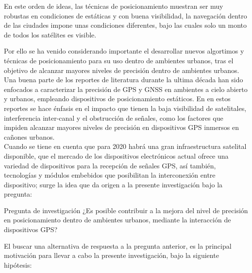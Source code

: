 En este orden de ideas, las técnicas de posicionamiento muestran ser muy robustas en condiciones de estáticas y con buena visibilidad, la navegación dentro de las ciudades impone unas condiciones diferentes, bajo las cuales solo un monto de todos los satélites es visible.

Por ello se ha venido considerando importante el desarrollar nuevos algortimos y técnicas de posicionamiento para su uso dentro de ambientes urbanos, tras el objetivo de alcanzar mayores niveles de precisión dentro de ambientes urbanos.\\

Una buena parte de los reportes de literatura durante la ultima década han sido enfocados a caracterizar la precisión de GPS y GNSS en ambientes a cielo abierto y urbanos, empleando dispositivos de posicionamiento estáticos. En en estos reportes se hace énfasis en el impacto que tienen la baja visibilidad de satelitales, interferencia inter-canal y el obstrucción de señales, como los factores que impiden alcanzar mayores niveles de precisión en dispositivos GPS inmersos en cañones urbanos.\\ 

Cuando se tiene en cuenta que para 2020 habrá una gran infraestructura satelital disponible, que el mercado de los dispositivos electrónicos actual ofrece una variedad de dispositivos para la recepción de señales GPS, así también, tecnologías y módulos embebidos que posibilitan la interconexión entre dispositivo; surge la idea que da origen a la presente investigación bajo la pregunta: \\


\begin{example}{Pregunta de investigación}
¿Es posible contribuir a la mejora del nivel de precisión en posicionamiento dentro de ambientes urbanos, mediante la interacción de dispositivos GPS?\\
\end{example}

El buscar una alternativa de respuesta a la pregunta anterior, es la principal motivación para llevar a cabo la presente investigación, bajo la siguiente hipótesis:\\

